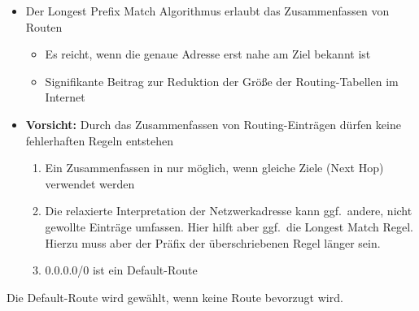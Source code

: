 \begin{itemize}
    \item Der Longest Prefix Match Algorithmus erlaubt das Zusammenfassen von Routen
    \begin{itemize}
        \item Es reicht, wenn die genaue Adresse erst nahe am Ziel bekannt ist
        \item Signifikante Beitrag zur Reduktion der Größe der Routing-Tabellen im Internet
    \end{itemize}
    \item \textbf{Vorsicht:} Durch das Zusammenfassen von Routing-Einträgen dürfen keine fehlerhaften Regeln entstehen
    \begin{enumerate}
        \item Ein Zusammenfassen in nur möglich, wenn gleiche Ziele (Next Hop) verwendet werden
        \item Die relaxierte Interpretation der Netzwerkadresse kann ggf.\ andere, nicht gewollte Einträge umfassen.
        Hier hilft aber ggf.\ die Longest Match Regel.
        Hierzu muss aber der Präfix der überschriebenen Regel länger sein.
        \item 0.0.0.0/0 ist ein Default-Route
    \end{enumerate}
\end{itemize}

Die Default-Route wird gewählt, wenn keine Route bevorzugt wird.
    